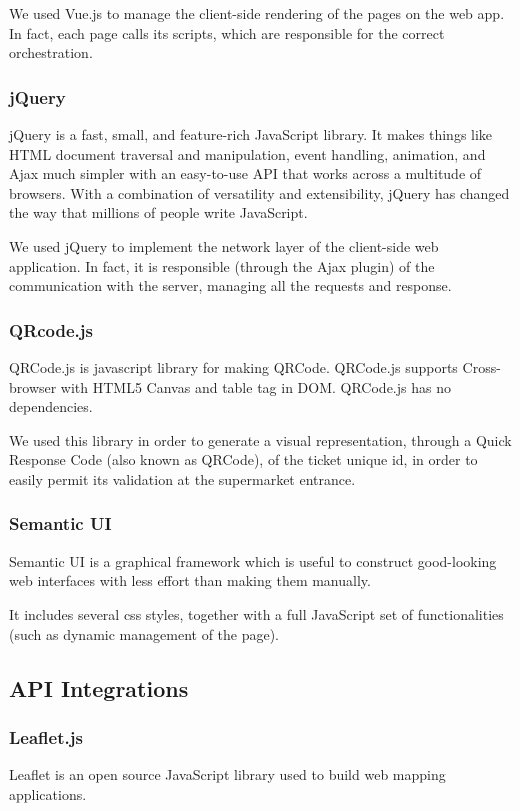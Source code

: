\documentclass[table, 12pt]{article}
\begin{document}
We used Vue.js to manage the client-side rendering of the pages on the web app. In fact, each page calls its scripts, which are responsible for the correct orchestration.
\subsubsection{jQuery}
jQuery is a fast, small, and feature-rich JavaScript library. It makes things like HTML document traversal and manipulation, event handling, animation, and Ajax much simpler with an easy-to-use API that works across a multitude of browsers. With a combination of versatility and extensibility, jQuery has changed the way that millions of people write JavaScript.

We used jQuery to implement the network layer of the client-side web application. In fact, it is responsible (through the Ajax plugin) of the communication with the server, managing all the requests and response.

\subsubsection{QRcode.js}
QRCode.js is javascript library for making QRCode. QRCode.js supports Cross-browser with HTML5 Canvas and table tag in DOM. QRCode.js has no dependencies.

We used this library in order to generate a visual representation, through a Quick Response Code (also known as QRCode), of the ticket unique id, in order to easily permit its validation at the supermarket entrance.

\subsubsection{Semantic UI}
Semantic UI is a graphical framework which is useful to construct good-looking web interfaces with less effort than making them manually.

It includes several css styles, together with a full JavaScript set of functionalities (such as dynamic management of the page).
\subsection{API Integrations}
\subsubsection{Leaflet.js}
Leaflet is an open source JavaScript library used to build web mapping applications.
\end{document}

